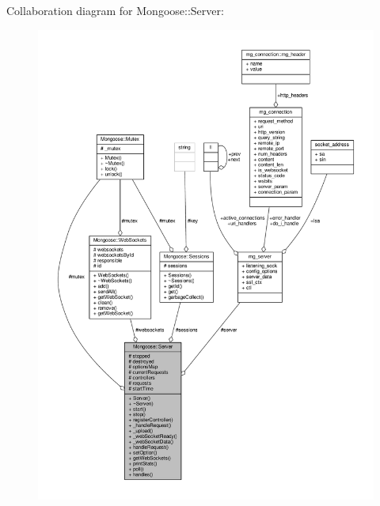 Collaboration diagram for Mongoose\+:\+:Server\+:
\nopagebreak
\begin{figure}[H]
\begin{center}
\leavevmode
\includegraphics[width=350pt]{d9/d5e/classMongoose_1_1Server__coll__graph}
\end{center}
\end{figure}
